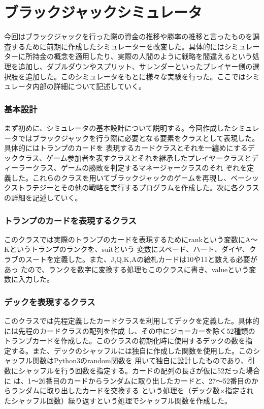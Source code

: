 
\section{ブラックジャックシミュレータ}
今回はブラックジャックを行った際の資金の推移や勝率の推移と言ったものを調査するために前期に作成したシミュレーターを改変した。具体的にはシミュレーターに所持金の概念を適用したり、実際の人間のように戦略を間違えるという処理を追加し、ダブルダウンやスプリット、サレンダーといったプレイヤー側の選択肢を追加した。このシミュレータをもとに様々な実験を行った。ここではシミュレータ内部の詳細について記述していく。

\subsubsection{基本設計}
まず初めに、シミュレータの基本設計について説明する。今回作成したシミュレータではブラックジャックを行う際に必要となる要素をクラスとして表現した。具体的にはトランプのカードを
表現するカードクラスとそれを一纏めにするデッククラス、ゲーム参加者を表すクラスとそれを継承したプレイヤークラスとディーラークラス、ゲームの勝敗を判定するマネージャークラスのそれ
ぞれを定義した。これらのクラスを用いてブラックジャックのゲームを再現し、ベーシックストラテジーとその他の戦略を実行するプログラムを作成した。次に各クラスの詳細を記述していく。

\subsubsection{トランプのカードを表現するクラス}
このクラスでは実際のトランプのカードを表現するためにrankという変数にA～Kというトランプのランクを、suitという
変数にスペード、ハート、ダイヤ、クラブのスートを定義した。また、J,Q,K,Aの絵札カードは10や11と数える必要があっ
たので、ランクを数字に変換する処理もこのクラスに書き、valueという変数に入力した。

\subsubsection{デックを表現するクラス}
このクラスでは先程定義したカードクラスを利用してデックを定義した。具体的には先程のカードクラスの配列を作成
し、その中にジョーカーを除く52種類のトランプカードを作成した。このクラスの初期化時に使用するデックの数を指
定する。また、デックのシャッフルには独自に作成した関数を使用した。このシャッフル関数はPython3のrandom関数を
用いて独自に設計したものであり、引数にシャッフルを行う回数を指定する。カードの配列の長さが仮に52だった場合に
は、1～26番目のカードからランダムに取り出したカードと、27～52番目のからランダムに取り出したカードを交換する
という処理を（デック数×指定されたシャッフル回数）繰り返すという処理でシャッフル関数を作成した。

